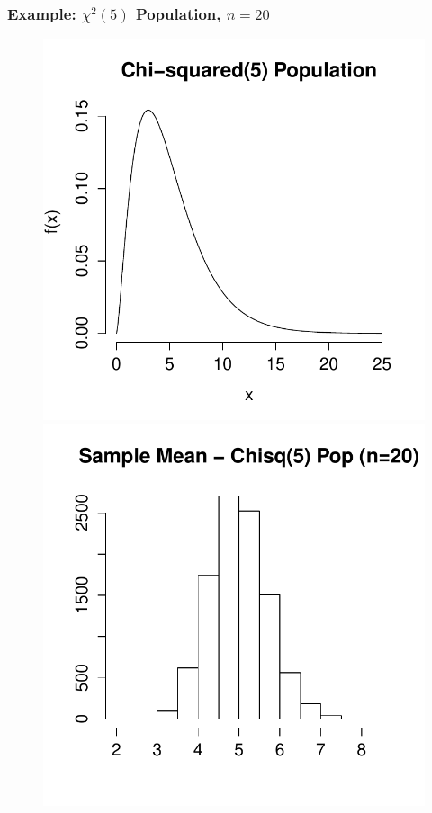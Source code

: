 \documentclass[handout]{beamer}
\begin{document}
\begin{frame}
\frametitle{Example: $\chi^2(5)$ Population, $n = 20$}
\begin{figure}
\centering
\includegraphics[scale = 0.4]{./images/chisq_pop}
\includegraphics[scale = 0.4]{./images/xbar_chisq}
\end{figure}
\end{frame}
\end{document}
